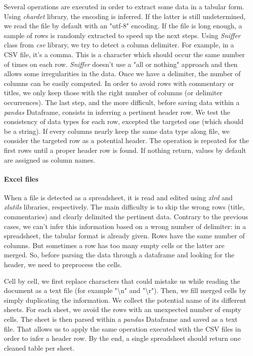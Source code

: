 \documentclass[a4paper]{article}
\begin{document}
	Several operations are executed in order to extract some data in a tabular form. Using \emph{chardet} library, the encoding is inferred. If the latter is still undetermined, we read the file by default with an "utf-8" encoding. If the file is long enough, a sample of rows is randomly extracted to speed up the next steps. Using \emph{Sniffer} class from \emph{csv} library, we try to detect a column delimiter. For example, in a CSV file, it's a comma. This is a character which should occur the same number of times on each row. \emph{Sniffer} doesn't use a "all or nothing" approach and then allows some irregularities in the data. Once we have a delimiter, the number of columns can be easily computed. In order to avoid rows with commentary or titles, we only keep those with the right number of columns (or delimiter occurrences). The last step, and the more difficult, before saving data within a \emph{pandas} Dataframe, consists in inferring a pertinent header row. We test the consistency of data types for each row, excepted the targeted one (which should be a string). If every columns nearly keep the same data type along file, we consider the targeted row as a potential header. The operation is repeated for the first rows until a proper header row is found. If nothing return, values by default are assigned as column names. 
	
	
	\paragraph{Excel files}
	
	When a file is detected as a spreadsheet, it is read and edited using \emph{xlrd} and \emph{xlutils} libraries, respectively. The main difficulty is to skip the wrong rows (title, commentaries) and clearly delimited the pertinent data. Contrary to the previous cases, we can't infer this information based on a wrong number of delimiter: in a spreadsheet, the tabular format is already given. Rows have the same number of columns. But sometimes a row has too many empty cells or the latter are merged. So, before parsing the data through a dataframe and looking for the header, we need to preprocess the cells.
	
	Cell by cell, we first replace characters that could mistake us while reading the document as a text file (for example "\textbackslash{n}" and "\textbackslash{r}"). Then, we fill merged cells by simply duplicating the information. We collect the potential name of its different sheets. For each sheet, we avoid the rows with an unexpected number of empty cells. The sheet is then parsed within a \emph{pandas} Dataframe and saved as a text file. That allows us to apply the same operation executed with the CSV files in order to infer a header row. By the end, a single spreadsheet should return one cleaned table per sheet.
	
\end{document}

